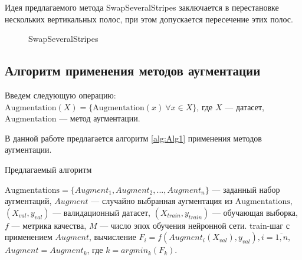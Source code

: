 \documentclass[12pt, fleqn]{article}
\begin{document}
\begin{enumerate}
\begin{enumerate}
    	\end{enumerate}
    	Идея предлагаемого метода SwapSeveralStripes заключается в перестановке нескольких вертикальных полос, при этом допускается пересечение этих полос.
    	\begin{figure}[ht!]
    	\caption{SwapSeveralStripes}
    	\label{fig:i2}
        \end{figure}
\end{enumerate}

\newpage
\subsection{Алгоритм применения методов аугментации}

Введем следующую операцию: \newline
$\text{Augmentation}(X) = \{\text{Augmentation}(x) \ \forall x \in X\}$, где $X$ --- датасет, \newline $\text{Augmentation}$ --- метод аугментации.

В данной работе предлагается алгоритм \ref{alg:Alg1} применения методов аугментации.

\algrenewcommand{}
\algrenewcommand{}

\begin{algorithm}
\caption{Предлагаемый алгоритм}\label{alg:Alg1}
\begin{algorithmic}
\State $\text{Augmentations} = \{Augment_1, Augment_2, ..., Augment_n\}$ --- заданный набор аугментаций,
\State $Augment$ --- случайно выбранная аугментация  из $\text{Augmentations}$,
\State $(X_{val}, y_{val})$ --- валидационный датасет, 
\State $(X_{train}, y_{train})$ --- обучающая выборка,
\State $f$ --- метрика качества,
\State $M$ --- число эпох обучения нейронной сети.
\State train-шаг с применением $Augment$,
\State вычисление $F_i = f(Augment_i(X_{val}), y_{val}), i = \overline{1,n}$,
\State $Augment = Augment_k$, где $k = argmin_k(F_k)$.
\EndFor
\end{algorithmic}
\end{algorithm}
\end{document}
